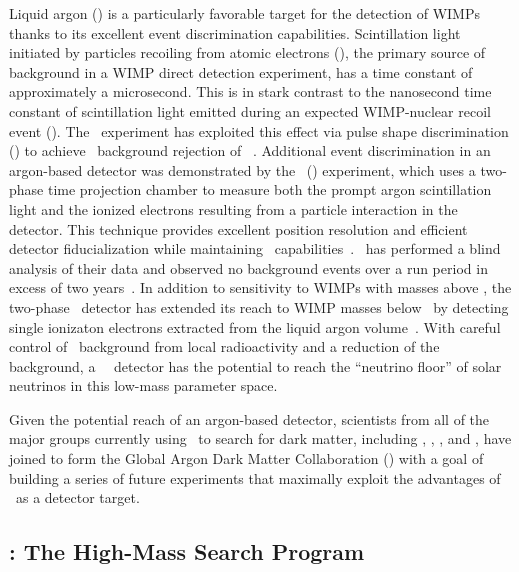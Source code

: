 Liquid argon (\LAr) is a particularly favorable target for the detection of WIMPs thanks to its excellent event discrimination capabilities. Scintillation light initiated by particles recoiling from atomic electrons (\ERs), the primary source of background in a WIMP direct detection experiment, has a time constant of approximately a microsecond. This is in stark contrast to the nanosecond time constant of scintillation light emitted during an expected WIMP-nuclear recoil event (\NR). The \DEAP\ experiment has exploited this effect via pulse shape discrimination (\PSD) to achieve \ER\ background rejection of \DEAPPSDRejection~\cite{Amaudruz:2018gr,Ajaj:2019wi}. Additional event discrimination in an argon-based detector was demonstrated by the \DSf\ (\DSfs) experiment, which uses a two-phase time projection chamber to measure both the prompt argon scintillation light and the ionized electrons resulting from a particle interaction in the detector. This technique provides excellent position resolution and efficient detector fiducialization while maintaining \PSD\ capabilities~\cite{Agnes:2015gu,Agnes:2016fz}.  \DSfs\ has performed a blind analysis of their data and observed no background events over a run period in excess of two years~\cite{Agnes:2018ep}. In addition to sensitivity to WIMPs with masses above \DSkHighMassThreshold, the two-phase \DSfs\ detector has extended its reach to WIMP masses below \DSlLowMassThreshold\ by detecting single ionizaton electrons extracted from the liquid argon volume~\cite{Agnes:2018fg,Agnes:2018ft}.  With careful control of \ER\ background from local radioactivity and a reduction of the  background, a \DSlApproxMassScale\ \LAr\ detector has the potential to reach the ``neutrino floor'' of solar neutrinos in this low-mass parameter space.


Given the potential reach of an argon-based detector, scientists from all of the major groups currently using \LAr\ to search for dark matter, including \ArDM, \DSfs, \DEAP, and \mCLEAN, have joined to form the Global Argon Dark Matter Collaboration (\GADMC) with a goal of building a series of future experiments that maximally exploit the advantages of \LAr\ as a detector target. 


\subsection{\DSk: The High-Mass Search Program}
\label{sec:DSk}


